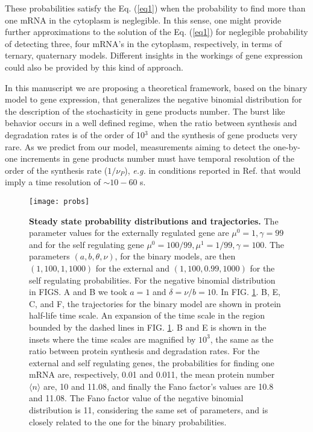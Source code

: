 These probabilities satisfy the Eq. (\ref{eq1}) when the probability
to find more than one mRNA in the cytoplasm is neglegible. In this
sense, one might provide further approximations to the solution of the
Eq. (\ref{eq1}) for neglegible probability of detecting three, four
mRNA's in the cytoplasm, respectively, in terms of ternary, quaternary
models. Different insights in the workings of gene expression could
also be provided by this kind of approach.

In this manuscript we are proposing a theoretical framework, based on
the binary model to gene expression, that generalizes the negative
binomial distribution for the description of the stochasticity in gene
products number. The burst like behavior occurs in a well defined
regime, when the ratio between synthesis and degradation rates is of
the order of 10$^3$ and the synthesis of gene products very rare. As
we predict from our model, measurements aiming to detect the
one-by-one increments in gene products number must have temporal
resolution of the order of the synthesis rate ($1/\nu_P$), {\em e.g.}
in conditions reported in Ref. \cite{cai06} that would imply a time
resolution of $\sim 10-60$ s.

 \begin{figure}
 \texttt{[image: probs]} \caption{ {\bf Steady state probability distributions and
     trajectories.}  The parameter values for the externally regulated
   gene are $\mu^0= 1, \gamma = 99$ and for the self regulating gene
   $\mu^0 = 100/99, \mu^1 = 1/99, \gamma = 100$.  The parameters $(a,
   b, \theta, \nu)$, for the binary models, are then $(1, 100, 1,
   1000)$ for the external and $(1, 100, 0.99, 1000)$ for the self
   regulating probabilities.  For the negative binomial distribution
   in FIGS. A and B we took $a=1$ and $\delta=\nu/b = 10$.  In
   FIG. \ref{figures}. B, E, C, and F, the trajectories for the binary
   model are shown in protein half-life time scale.  An expansion of
   the time scale in the region bounded by the dashed lines in
   FIG. \ref{figures}. B and E is shown in the insets where the time
   scales are magnified by $10^3$, the same as the ratio between
   protein synthesis and degradation rates. For the external and self
   regulating genes, the probabilities for finding one mRNA are,
   respectively, 0.01 and 0.011, the mean protein number $\langle n
   \rangle$ are, 10 and 11.08, and finally the Fano factor's values
   are 10.8 and 11.08.  The Fano factor value of the negative binomial
   distribution is 11, considering the same set of parameters, and is
   closely related to the one for the binary probabilities.}
  \label{figures}
 \end{figure}




